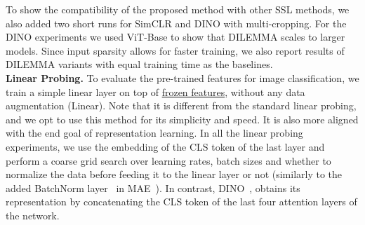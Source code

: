 \documentclass[letterpaper]{article} \usepackage{aaai23}  \usepackage{times}  \usepackage{helvet}  \usepackage{courier}  \usepackage[hyphens]{url}  \usepackage{graphicx} \urlstyle{rm} \def\UrlFont{\rm}  \usepackage{natbib}  \usepackage{caption} \frenchspacing  \setlength{\pdfpagewidth}{8.5in}  \setlength{\pdfpageheight}{11in}  \usepackage{algorithm}
\newcommand{\methodname}{DILEMMA}
\begin{document}
To show the compatibility of the proposed method with other SSL methods, we also added two short runs for SimCLR and DINO with multi-cropping. For the DINO experiments we used ViT-Base to show that {\methodname} scales to larger models.
Since input sparsity allows for faster training, we also report results of {\methodname} variants with equal training time as the baselines.  
\\

\noindent\textbf{Linear Probing.} To evaluate the pre-trained features for image classification, we train a simple linear layer on top of \underline{frozen features}, without any data augmentation (Linear). Note that it is different from the standard linear probing, and we opt to use this method for its simplicity and speed. It is also more aligned with the end goal of representation learning. In all the linear probing experiments, we use the embedding of the CLS token of the last layer and perform a coarse grid search over learning rates, batch sizes and whether to normalize the data before feeding it to the linear layer or not (similarly to the added BatchNorm layer~\cite{ioffe2015batch} in MAE~\cite{he2021masked}). In contrast, DINO~\cite{caron2021emerging}, obtains its representation by concatenating the CLS token of the last four attention layers of the network.
\end{document}
